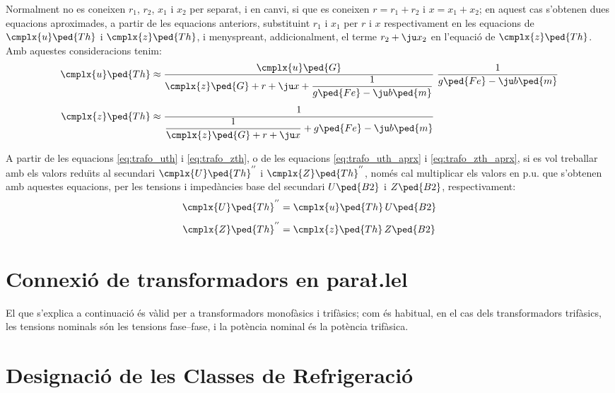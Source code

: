 Normalment no es coneixen $r_1$, $r_2$, $x_1$ i $x_2$ per separat, i
en canvi, si que es coneixen $r=r_1+r_2$ i $x=x_1+x_2$; en aquest
cas s'obtenen dues equacions aproximades, a partir de les equacions
anteriors, substituint $r_1$ i $x_1$ per $r$ i $x$ respectivament en
les equacions de $\cmplx{u}\ped{Th}$ i $\cmplx{z}\ped{Th}$, i
menyspreant, addicionalment, el terme $r_2 + \ju x_2$ en l'equaci\'{o}
de $\cmplx{z}\ped{Th}$. Amb aquestes consideracions tenim:
\begin{align}
    \cmplx{u}\ped{Th} &\approx \frac{\cmplx{u}\ped{G}}{\cmplx{z}\ped{G} + r + \ju
    x + \dfrac{1}{g\ped{Fe}-\ju b\ped{m}}} \;\frac{1}{g\ped{Fe}-\ju
    b\ped{m}} \label{eq:trafo_uth_aprx}\\[1ex]
    \cmplx{z}\ped{Th} &\approx \frac{1}{\dfrac{1}{\cmplx{z}\ped{G} + r +
    \ju x} + g\ped{Fe}-\ju b\ped{m}}\label{eq:trafo_zth_aprx}
\end{align}

A partir de les equacions \eqref{eq:trafo_uth} i
\eqref{eq:trafo_zth}, o de les equacions \eqref{eq:trafo_uth_aprx} i
\eqref{eq:trafo_zth_aprx}, si es vol treballar amb els valors
redu\"{\i}ts al secundari $\cmplx{U}\ped{Th}^{''}$ i
$\cmplx{Z}\ped{Th}^{''}$, nom\'{e}s cal multiplicar els valors en p.u.
que s'obtenen amb aquestes equacions, per les tensions i imped\`{a}ncies
base del secundari $U\ped{B2}$ i $Z\ped{B2}$, respectivament:
\begin{align}
    \cmplx{U}\ped{Th}^{''} &= \cmplx{u}\ped{Th} \, U\ped{B2} \\[1ex]
    \cmplx{Z}\ped{Th}^{''} &= \cmplx{z}\ped{Th} \, Z\ped{B2}
\end{align}


\section{Connexi\'{o} de transformadors en para{\l.l}el}

El que s'explica a continuaci\'{o} \'{e}s v\`{a}lid per a transformadors
monof\`{a}sics i trif\`{a}sics; com \'{e}s habitual, en el cas dels
transformadors trif\`{a}sics, les tensions nominals s\'{o}n les tensions
fase--fase, i la pot\`{e}ncia nominal \'{e}s la pot\`{e}ncia trif\`{a}sica.


\section{Designaci\'{o} de les Classes de Refrigeraci\'{o}}\label{sec:traf_pot_clas_refrig}
   


